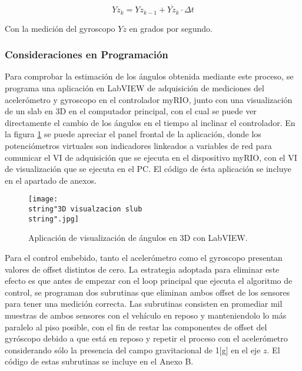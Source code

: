 \documentclass[\main/main.tex]{subfiles}
\begin{document}
\begin{equation}
Yz_{k}=Yz_{k-1} + \dot{Yz_{k}}\cdot\Delta t
\end{equation}

Con la medición del gyroscopo $Yz$ en grados
por segundo.

\subsubsection{Consideraciones en Programación}

Para comprobar la estimación de los ángulos obtenida mediante este
proceso, se programa una aplicación en LabVIEW de adquisición de mediciones
del acelerómetro y gyroscopo en el controlador myRIO, junto con una
visualización de un slab en 3D en el computador principal, con el
cual se puede ver directamente el cambio de los ángulos en el tiempo
al inclinar el controlador. En la figura \ref{fig: Slab 3D} se puede apreciar el panel frontal de la aplicación, donde los potenciómetros virtuales son indicadores linkeados a variables de red para comunicar el VI de adquisición que se ejecuta en el dispositivo myRIO, con el VI de visualización que se ejecuta en el PC.
El código de ésta aplicación se incluye
en el apartado de anexos.

\begin{figure}[H]
\noindent \begin{centering}
\texttt{[image: \\string"3D visualzacion slub\\string".jpg]}
\par\end{centering}
\caption{Aplicación de visualización de ángulos en 3D con LabVIEW.}\label{fig: Slab 3D}\noindent 
\end{figure}

Para el control embebido, tanto el acelerómetro como el gyroscopo
presentan valores de offset distintos de cero. La estrategia adoptada
para eliminar este efecto es que antes de empezar con el loop principal
que ejecuta el algoritmo de control, se programan dos subrutinas que
eliminan ambos offset de los sensores para tener una medición correcta.
Las subrutinas consisten en promediar mil muestras de ambos sensores
con el vehículo en reposo y manteniendolo lo más paralelo al piso
posible, con el fin de restar las componentes de offset del gyróscopo
debido a que está en reposo y repetir el proceso con el acelerómetro
considerando sólo la presencia del campo gravitacional de 1{[}g{]}
en el eje $z$. El código de estas subrutinas se incluye en el Anexo B.
\end{document}
